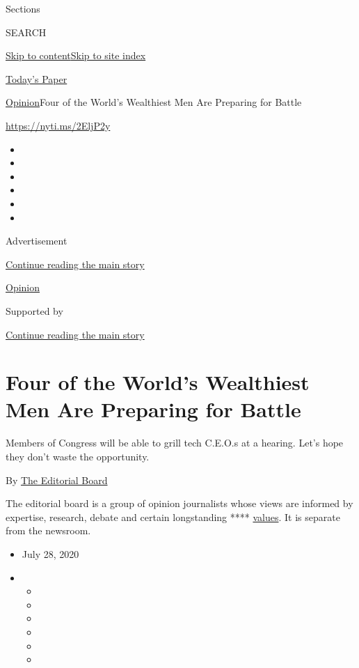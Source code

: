 Sections

SEARCH

\protect\hyperlink{site-content}{Skip to
content}\protect\hyperlink{site-index}{Skip to site index}

\href{https://myaccount.nytimes3xbfgragh.onion/auth/login?response_type=cookie\&client_id=vi}{}

\href{https://www.nytimes3xbfgragh.onion/section/todayspaper}{Today's
Paper}

\href{/section/opinion}{Opinion}\textbar{}Four of the World's Wealthiest
Men Are Preparing for Battle

\url{https://nyti.ms/2EljP2y}

\begin{itemize}
\item
\item
\item
\item
\item
\item
\end{itemize}

Advertisement

\protect\hyperlink{after-top}{Continue reading the main story}

\href{/section/opinion}{Opinion}

Supported by

\protect\hyperlink{after-sponsor}{Continue reading the main story}

\hypertarget{four-of-the-worlds-wealthiest-men-are-preparing-for-battle}{%
\section{Four of the World's Wealthiest Men Are Preparing for
Battle}\label{four-of-the-worlds-wealthiest-men-are-preparing-for-battle}}

Members of Congress will be able to grill tech C.E.O.s at a hearing.
Let's hope they don't waste the opportunity.

By
\href{https://www.nytimes3xbfgragh.onion/interactive/opinion/editorialboard.html}{The
Editorial Board}

The editorial board is a group of opinion journalists whose views are
informed by expertise, research, debate and certain longstanding ****
\href{https://www.nytimes3xbfgragh.onion/interactive/2018/opinion/editorialboard.html}{values}.
It is separate from the newsroom.

\begin{itemize}
\item
  July 28, 2020
\item
  \begin{itemize}
  \item
  \item
  \item
  \item
  \item
  \item
  \end{itemize}
\end{itemize}


